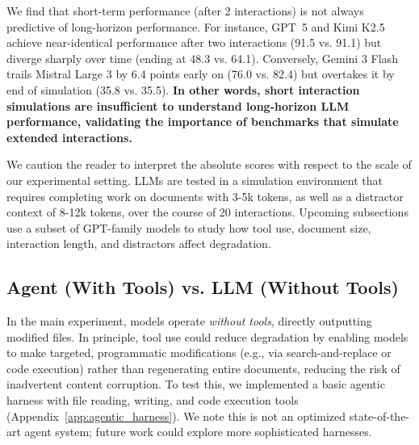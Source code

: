 \documentclass{article} %
\begin{document}
We find that short-term performance (after 2 interactions) is not always predictive of long-horizon performance. For instance, GPT~5 and Kimi K2.5 achieve near-identical performance after two interactions (91.5 vs. 91.1) but diverge sharply over time (ending at 48.3 vs. 64.1). Conversely, Gemini 3 Flash trails Mistral Large 3 by 6.4 points early on (76.0 vs. 82.4) but overtakes it by end of simulation (35.8 vs. 35.5). \textbf{In other words, short interaction simulations are insufficient to understand long-horizon LLM performance, validating the importance of benchmarks that simulate extended interactions.}

We caution the reader to interpret the absolute scores with respect to the scale of our experimental setting. LLMs are tested in a simulation environment that requires completing work on documents with 3-5k tokens, as well as a distractor context of 8-12k tokens, over the course of 20 interactions. Upcoming subsections use a subset of GPT-family models to study how tool use, document size, interaction length, and distractors affect degradation.

\begin{table}[h!]
\vspace{-1\intextsep}

\caption{Visual histogram of end of simulation scores (after 20 interactions), broken down across the 52 domains in \benchmark{}. Scores are binned into buckets: 
 (``\textit{ready}'')\;
\;
\;
\;
\;
\;
. Catastrophic corruption (80 and below) occurs in more than 80\% of model, domain combinations. Python is the only domain where a majority of models achieve the ready status, and the best model (Gemini 3.1 Pro) is ready for delegated workflows in only 11 out of 52 domains.}
\label{tab:round10_by_domain}
\vspace{-1\intextsep}
\end{table}

\subsection{Agent (With Tools) vs. LLM (Without Tools)} \label{sec:agentic}

In the main experiment, models operate \textit{without tools}, directly outputting modified files. In principle, tool use could reduce degradation by enabling models to make targeted, programmatic modifications (e.g., via search-and-replace or code execution) rather than regenerating entire documents, reducing the risk of inadvertent content corruption. To test this, we implemented a basic agentic harness \citep{Yao2022ReActSR} with file reading, writing, and code execution tools (Appendix~\ref{app:agentic_harness}). We note this is not an optimized state-of-the-art agent system; future work could explore more sophisticated harnesses.
\end{document}
